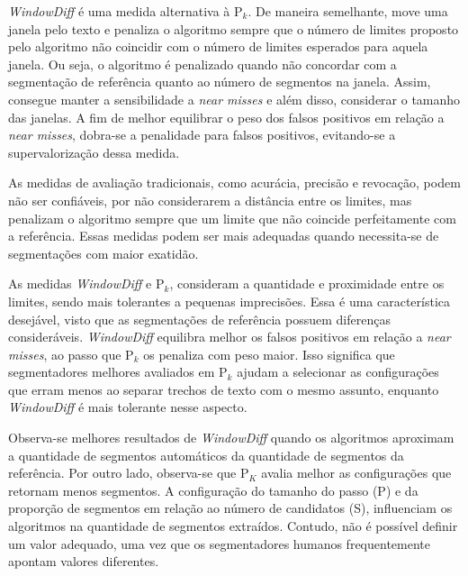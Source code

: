 \textit{WindowDiff} é uma medida alternativa à P$_k$. %
De maneira semelhante, move uma janela pelo texto e penaliza o algoritmo sempre que o número de limites proposto pelo algoritmo não coincidir com o número de limites esperados para aquela janela. Ou seja, o algoritmo é penalizado quando não concordar com a segmentação de referência quanto ao número de segmentos na janela.  Assim, consegue manter a sensibilidade a \textit{near misses} e além disso, considerar o tamanho das janelas.  A fim de melhor equilibrar o peso dos falsos positivos em relação a \textit{near misses}, dobra-se a penalidade para falsos positivos, evitando-se a supervalorização dessa medida. 







As medidas de avaliação tradicionais, como acurácia, precisão e revocação, podem não ser confiáveis, por não considerarem a distância entre os limites, mas penalizam o algoritmo sempre que um limite que não coincide perfeitamente com a referência. Essas medidas podem ser mais adequadas quando necessita-se de segmentações com maior exatidão. 


As medidas \textit{WindowDiff} e P$_k$, consideram a quantidade e proximidade entre os limites, sendo mais tolerantes a pequenas imprecisões. Essa é uma característica desejável, visto que as segmentações de referência possuem diferenças consideráveis. 
%
\textit{WindowDiff} equilibra melhor os falsos positivos em relação a \textit{near misses}, ao passo que P$_k$ os penaliza com peso maior. Isso significa que segmentadores melhores avaliados em P$_k$ ajudam a selecionar as configurações que erram menos ao separar trechos de texto com o mesmo assunto, enquanto \textit{WindowDiff} é mais tolerante nesse aspecto.

Observa-se  melhores resultados de \textit{WindowDiff} quando os algoritmos aproximam a quantidade de segmentos automáticos da quantidade de segmentos da referência. %
Por outro lado, observa-se que P$_K$ avalia melhor as configurações que retornam menos segmentos. A configuração do tamanho do passo (P) e da proporção de segmentos em relação ao número de candidatos (S), influenciam os algoritmos na quantidade de segmentos extraídos. Contudo, não é possível definir um valor adequado, uma vez que os segmentadores humanos frequentemente apontam valores diferentes.





